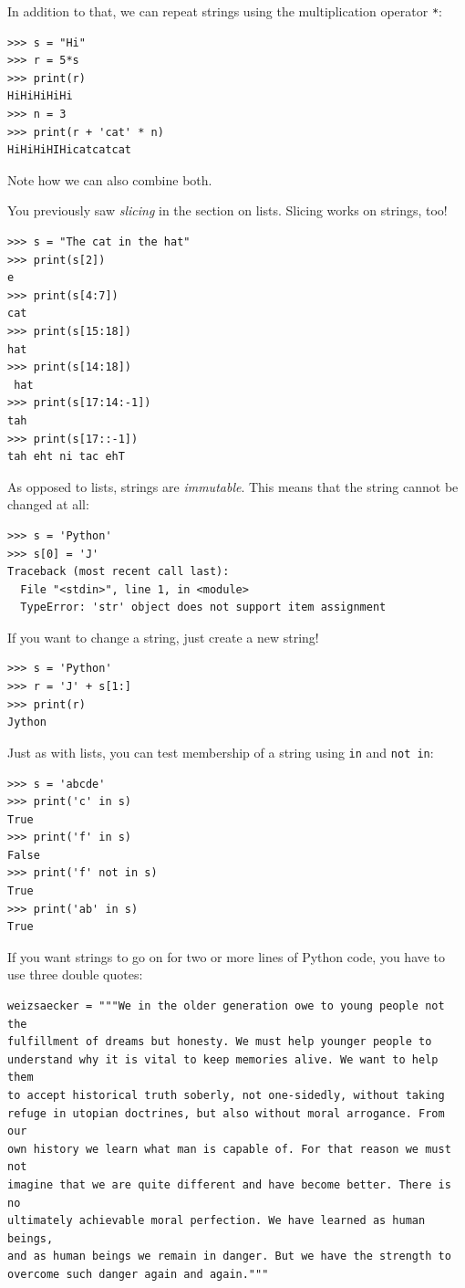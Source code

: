 \documentclass[11pt]{cselabheader}
\begin{document}
In addition to that, we can repeat strings using the multiplication operator
\lstinline!*!:
\begin{lstlisting}[style=ipython]
>>> s = "Hi"
>>> r = 5*s
>>> print(r)
HiHiHiHiHi
>>> n = 3
>>> print(r + 'cat' * n)
HiHiHiHIHicatcatcat
\end{lstlisting}
Note how we can also combine both.

You previously saw \emph{slicing} in the section on lists. Slicing works on strings, too!
\begin{lstlisting}[style=ipython]
>>> s = "The cat in the hat"
>>> print(s[2])
e
>>> print(s[4:7])
cat
>>> print(s[15:18])
hat
>>> print(s[14:18])
 hat
>>> print(s[17:14:-1])
tah
>>> print(s[17::-1])
tah eht ni tac ehT
\end{lstlisting}

As opposed to lists, strings are \emph{immutable}. This means that the string
cannot be changed at all:
\begin{lstlisting}[style=ipython]
>>> s = 'Python'
>>> s[0] = 'J'
Traceback (most recent call last):
  File "<stdin>", line 1, in <module>
  TypeError: 'str' object does not support item assignment
\end{lstlisting}

If you want to change a string, just create a new string!
\begin{lstlisting}[style=ipython]
>>> s = 'Python'
>>> r = 'J' + s[1:]
>>> print(r)
Jython
\end{lstlisting}

Just as with lists, you can test membership of a string using \lstinline!in! and
\lstinline!not in!:
\begin{lstlisting}[style=ipython]
>>> s = 'abcde'
>>> print('c' in s)
True
>>> print('f' in s)
False
>>> print('f' not in s)
True
>>> print('ab' in s)
True
\end{lstlisting}

If you want strings to go on for two or more lines of Python code, you have to use three double
quotes:
\begin{lstlisting}[caption={Excerpt of Richard von Weizs\"{a}cker's speech in
the Bundestag to commemorate the 40th anniversary of the end of World War II.}]
weizsaecker = """We in the older generation owe to young people not the 
fulfillment of dreams but honesty. We must help younger people to 
understand why it is vital to keep memories alive. We want to help them 
to accept historical truth soberly, not one-sidedly, without taking 
refuge in utopian doctrines, but also without moral arrogance. From our
own history we learn what man is capable of. For that reason we must not
imagine that we are quite different and have become better. There is no
ultimately achievable moral perfection. We have learned as human beings,
and as human beings we remain in danger. But we have the strength to 
overcome such danger again and again."""
\end{lstlisting}
\end{document}
